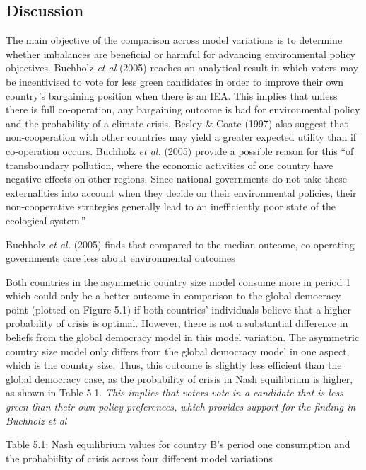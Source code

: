 \documentclass[11pt,preprint, authoryear]{elsarticle}
\numberwithin{equation}{section}
\numberwithin{figure}{section}
\numberwithin{table}{section}
\begin{document}
\hypertarget{discussion}{%
\subsection{Discussion}\label{discussion}}

The main objective of the comparison across model variations is to
determine whether imbalances are beneficial or harmful for advancing
environmental policy objectives. Buchholz \emph{et al} (2005) reaches an
analytical result in which voters may be incentivised to vote for less
green candidates in order to improve their own country's bargaining
position when there is an IEA. This implies that unless there is full
co-operation, any bargaining outcome is bad for environmental policy and
the probability of a climate crisis. Besley \& Coate (1997) also suggest
that non-cooperation with other countries may yield a greater expected
utility than if co-operation occurs. Buchholz \emph{et al.} (2005)
provide a possible reason for this ``of transboundary pollution, where
the economic activities of one country have negative effects on other
regions. Since national governments do not take these externalities into
account when they decide on their environmental policies, their
non-cooperative strategies generally lead to an inefficiently poor state
of the ecological system.''

Buchholz \emph{et al.} (2005) finds that compared to the median outcome,
co-operating governments care less about environmental outcomes

Both countries in the asymmetric country size model consume more in
period 1 which could only be a better outcome in comparison to the
global democracy point (plotted on Figure 5.1) if both countries'
individuals believe that a higher probability of crisis is optimal.
However, there is not a substantial difference in beliefs from the
global democracy model in this model variation. The asymmetric country
size model only differs from the global democracy model in one aspect,
which is the country size. Thus, this outcome is slightly less efficient
than the global democracy case, as the probability of crisis in Nash
equilibrium is higher, as shown in Table 5.1. \emph{This implies that
voters vote in a candidate that is less green than their own policy
preferences, which provides support for the finding in Buchholz et al}

\newpage
\begin{center}
Table 5.1: Nash equilibrium values for country B's period one consumption and the probabiility of crisis across four different model variations
\end{center}
\end{document}

